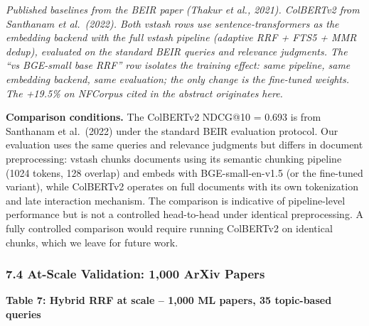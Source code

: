 \documentclass[
  11pt]{article}
\begin{document}
\emph{Published baselines from the BEIR paper (Thakur et al., 2021). ColBERTv2 from Santhanam et al.~(2022). Both vstash rows use sentence-transformers as the embedding backend with the full vstash pipeline (adaptive RRF + FTS5 + MMR dedup), evaluated on the standard BEIR queries and relevance judgments. The ``vs BGE-small base RRF'' row isolates the training effect: same pipeline, same embedding backend, same evaluation; the only change is the fine-tuned weights. The +19.5\% on NFCorpus cited in the abstract originates here.}

\textbf{Comparison conditions.} The ColBERTv2 NDCG@10 = 0.693 is from Santhanam et al.~(2022) under the standard BEIR evaluation protocol. Our evaluation uses the same queries and relevance judgments but differs in document preprocessing: vstash chunks documents using its semantic chunking pipeline (1024 tokens, 128 overlap) and embeds with BGE-small-en-v1.5 (or the fine-tuned variant), while ColBERTv2 operates on full documents with its own tokenization and late interaction mechanism. The comparison is indicative of pipeline-level performance but is not a controlled head-to-head under identical preprocessing. A fully controlled comparison would require running ColBERTv2 on identical chunks, which we leave for future work.

\subsubsection{7.4 At-Scale Validation: 1,000 ArXiv Papers}\label{at-scale-validation-1000-arxiv-papers}

\textbf{Table 7: Hybrid RRF at scale -- 1,000 ML papers, 35 topic-based queries}
\end{document}
